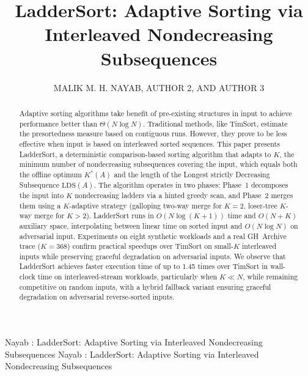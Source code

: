 \documentclass{ieeeaccess}
\theoremstyle{plain}
\theoremstyle{definition}
\begin{document}

\title{LadderSort: Adaptive Sorting via Interleaved Nondecreasing Subsequences}

\author{\uppercase{Malik M. H. Nayab},
\uppercase{Author 2}, AND
\uppercase{Author 3}}

\address[1]{COMSATS University Islamabad, Abbottabad Campus, Pakistan (e-mail: hamza.nayab48@gmail.com)}
\address[2]{COMSATS University Islamabad, Abbottabad Campus, Pakistan (e-mail: author2@cuiatd.edu.pk)}
\address[3]{COMSATS University Islamabad, Abbottabad Campus, Pakistan (e-mail: author3@cuiatd.edu.pk)}

\markboth
{Nayab \headeretal: LadderSort: Adaptive Sorting via Interleaved Nondecreasing Subsequences}
{Nayab \headeretal: LadderSort: Adaptive Sorting via Interleaved Nondecreasing Subsequences}


\begin{abstract}
Adaptive sorting algorithms take benefit of pre-existing structures in input to achieve performance better than $\Theta(N \log N)$. Traditional methods, like TimSort, estimate the presortedness measure based on contiguous runs. However, they prove to be less effective when input is based on interleaved sorted sequences. This paper presents LadderSort, a deterministic comparison-based sorting algorithm that adapts to $K$, the minimum number of nondecreasing subsequences covering the input, which equals both the offline optimum $K^*(A)$ and the length of the Longest strictly Decreasing Subsequence $\mathrm{LDS}(A)$. The algorithm operates in two phases: Phase~1 decomposes the input into $K$ nondecreasing ladders via a hinted greedy scan, and Phase~2 merges them using a $K$-adaptive strategy (galloping two-way merge for $K=2$, loser-tree $K$-way merge for $K>2$). LadderSort runs in $O(N\log(K+1))$ time and $O(N+K)$ auxiliary space, interpolating between linear time on sorted input and $O(N\log N)$ on adversarial input. Experiments on eight synthetic workloads and a real GH~Archive trace ($K=368$) confirm practical speedups over TimSort on small-$K$ interleaved inputs while preserving graceful degradation on adversarial inputs. We observe that LadderSort achieves faster execution time of up to 1.45 times over TimSort in wall-clock time on interleaved-stream workloads, particularly when $K \ll N$, while remaining competitive on random inputs, with a hybrid fallback variant ensuring graceful degradation on adversarial reverse-sorted inputs.
\end{abstract}
\end{document}
